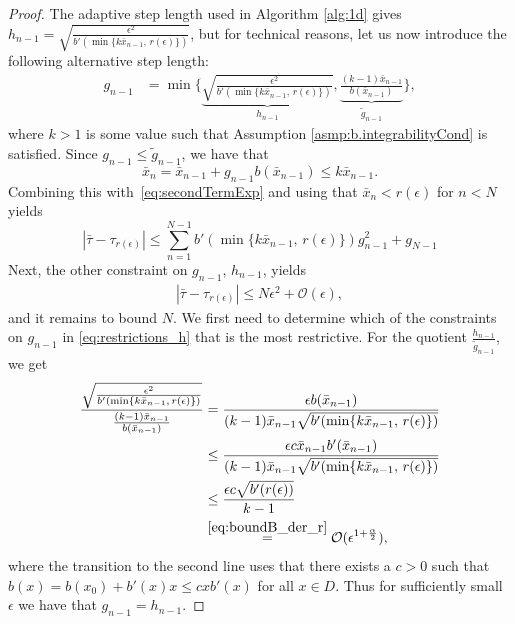 \documentclass[a4paper, oneside, reqno]{amsart}
\newcommand{\abs}[1]{\left\lvert#1\right\rvert}
\theoremstyle{remark}
\begin{document}
\begin{proof}
    The adaptive step length used in Algorithm \ref{alg:1d} gives \(h_{n-1} = \sqrt{\frac{\epsilon^2}{b'(\min\{k\bar x_{n-1},\,r(\epsilon)\})}}\), but for technical reasons, let us now introduce the following alternative step length:
    \begin{align}
        \label{eq:restrictions_h}
        g_{n-1} &= \min\Bigg\{ \underbrace{\sqrt{\frac{\epsilon^2}{b'(\min\{k\bar x_{n-1},\,r(\epsilon)\})}}}_{h_{n-1}}, \underbrace{\frac{(k-1)\bar x_{n-1}}{b(\bar x_{n-1})}}_{\tilde g_{n-1}} \Bigg\},
    \end{align}
    where \(k > 1\) is some value such that Assumption \ref{asmp:b.integrabilityCond} is satisfied. 
    Since \(g_{n-1} \leq \tilde g_{n-1}\), we have that
    \[\bar x_n = \bar x_{n-1} + g_{n-1}b(\bar x_{n-1}) \leq k\bar x_{n-1}.\] 
    Combining this with~\eqref{eq:secondTermExp} 
    and using that \(\bar x_{n} < r(\epsilon)\) for \(n < N\) yields
    \[\abs{\bar\tau-\tau_{r(\epsilon)}} \leq \sum_{n=1}^{N-1}b'(\min\{k\bar x_{n-1},\, r(\epsilon)\})g_{n-1}^2 + g_{N-1}\]
    Next, the other constraint on \(g_{n-1}\), \(h_{n-1}\), yields
    \begin{align}
        \label{eq:secondErrorTermFinal}
        \abs{\bar\tau-\tau_{r(\epsilon)}} \leq N\epsilon^2 + \mathcal{O}(\epsilon),
    \end{align}
    and it remains to bound \(N\). We first need to determine which of the constraints on \(g_{n-1}\) in \eqref{eq:restrictions_h} that is the most restrictive. For the quotient \(\frac{h_{n-1}}{\tilde g_{n-1}}\), we get
    \begin{align*}
        \frac{\sqrt{\frac{\epsilon^2}{b'(\min\{k\bar x_{n-1},\, r(\epsilon)\})}}}{\frac{(k-1)\bar x_{n-1}}{b(\bar x_{n-1})}} &= \frac{\epsilon b(\bar x_{n-1})}{(k-1)\bar x_{n-1}\sqrt{b'(\min\{k\bar x_{n-1},\, r(\epsilon)\})}} \\
        &\leq \frac{\epsilon c\bar x_{n-1} b'(\bar x_{n-1})}{(k-1)\bar x_{n-1}\sqrt{b'(\min\{k\bar x_{n-1},\, r(\epsilon)\})}} \\
        &\leq \frac{\epsilon c \sqrt{b'(r(\epsilon))}}{k-1} \\
        &\overset{\eqref{eq:boundB_der_r}}{=} \mathcal{O}(\epsilon^{1+\frac{\alpha}{2}}),
    \end{align*}
    where the transition to the second line uses that there exists a \(c>0\) such that \(b(x) = b(x_0) + b'(x)x \leq cxb'(x)\) for all \(x \in D\). 
    Thus for sufficiently small \(\epsilon\) we have that \(g_{n-1} = h_{n-1}\).


\end{proof}
\end{document}
